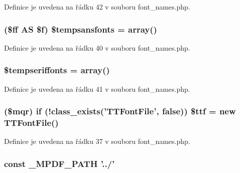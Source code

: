 Definice je uvedena na řádku 42 v souboru font\-\_\-names.\-php.

\hypertarget{font__names_8php_a941da3f5358aef0d6ec41161b4951148}{
\subsubsection[{\$tempsansfonts}]{ (\$ff A\-S \$f) \$tempsansfonts = array()}}\label{font__names_8php_a941da3f5358aef0d6ec41161b4951148}


Definice je uvedena na řádku 40 v souboru font\-\_\-names.\-php.

\hypertarget{font__names_8php_ab74dd355fb2c8023006dd96b28490b57}{
\subsubsection[{\$tempseriffonts}]{\setlength{\rightskip}{0pt plus 5cm}\$tempseriffonts = array()}}\label{font__names_8php_ab74dd355fb2c8023006dd96b28490b57}


Definice je uvedena na řádku 41 v souboru font\-\_\-names.\-php.

\hypertarget{font__names_8php_ac30f1eb54e5b52f5b30306ee5e3b23e7}{
\subsubsection[{\$ttf}]{ (\$mqr) {\bf if} (!class\-\_\-exists('{\bf T\-T\-Font\-File}', {\bf false})) \$ttf = new {\bf T\-T\-Font\-File}()}}\label{font__names_8php_ac30f1eb54e5b52f5b30306ee5e3b23e7}


Definice je uvedena na řádku 37 v souboru font\-\_\-names.\-php.

\hypertarget{font__names_8php_a79734099b3f1817b14687db06cde3132}{
\subsubsection[{\-\_\-\-M\-P\-D\-F\-\_\-\-P\-A\-T\-H}]{\setlength{\rightskip}{0pt plus 5cm}const \-\_\-\-M\-P\-D\-F\-\_\-\-P\-A\-T\-H '../'}}\label{font__names_8php_a79734099b3f1817b14687db06cde3132}


